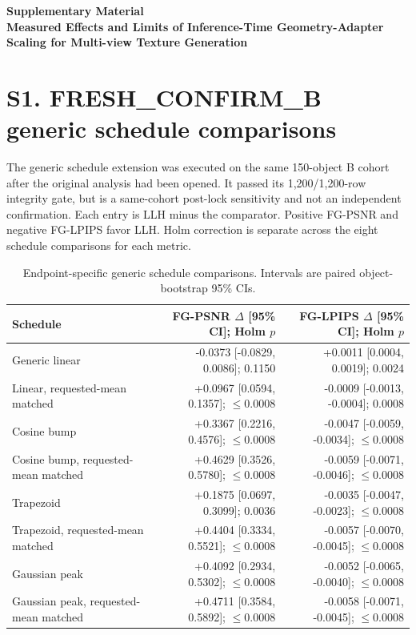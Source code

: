 \documentclass[10pt]{article}
\begin{document}
\begin{center}
{\Large\bfseries Supplementary Material}\\[4pt]
{\large\bfseries Measured Effects and Limits of Inference-Time Geometry-Adapter Scaling for Multi-view Texture Generation}
\end{center}

\section{S1. FRESH\_CONFIRM\_B generic schedule comparisons}

The generic schedule extension was executed on the same 150-object B cohort after the original analysis had been opened. It passed its 1,200/1,200-row integrity gate, but is a same-cohort post-lock sensitivity and not an independent confirmation. Each entry is LLH minus the comparator. Positive FG-PSNR and negative FG-LPIPS favor LLH. Holm correction is separate across the eight schedule comparisons for each metric.

\begin{table}[h]
\centering\scriptsize
\caption{Endpoint-specific generic schedule comparisons. Intervals are paired object-bootstrap 95\% CIs.}
\begin{tabular}{lrr}
\toprule
Schedule & FG-PSNR $\Delta$ [95\% CI]; Holm $p$ & FG-LPIPS $\Delta$ [95\% CI]; Holm $p$ \\
\midrule
Generic linear & -0.0373 [-0.0829, 0.0086]; 0.1150 & +0.0011 [0.0004, 0.0019]; 0.0024 \\
Linear, requested-mean matched & +0.0967 [0.0594, 0.1357]; $\leq$0.0008 & -0.0009 [-0.0013, -0.0004]; 0.0008 \\
Cosine bump & +0.3367 [0.2216, 0.4576]; $\leq$0.0008 & -0.0047 [-0.0059, -0.0034]; $\leq$0.0008 \\
Cosine bump, requested-mean matched & +0.4629 [0.3526, 0.5780]; $\leq$0.0008 & -0.0059 [-0.0071, -0.0046]; $\leq$0.0008 \\
Trapezoid & +0.1875 [0.0697, 0.3099]; 0.0036 & -0.0035 [-0.0047, -0.0023]; $\leq$0.0008 \\
Trapezoid, requested-mean matched & +0.4404 [0.3334, 0.5521]; $\leq$0.0008 & -0.0057 [-0.0070, -0.0045]; $\leq$0.0008 \\
Gaussian peak & +0.4092 [0.2934, 0.5302]; $\leq$0.0008 & -0.0052 [-0.0065, -0.0040]; $\leq$0.0008 \\
Gaussian peak, requested-mean matched & +0.4711 [0.3584, 0.5892]; $\leq$0.0008 & -0.0058 [-0.0071, -0.0045]; $\leq$0.0008 \\
\bottomrule
\end{tabular}
\end{table}
\end{document}
